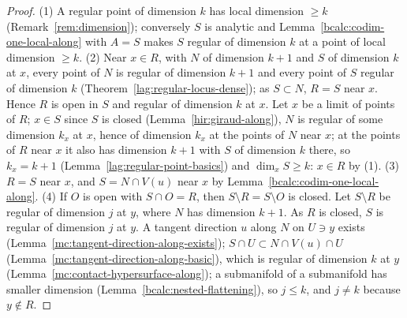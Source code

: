\begin{proof}
\mixedleanok
(1) A regular point of dimension \(k\) has local dimension \(\ge k\) (Remark~\ref{rem:dimension}); conversely \(S\) is analytic and Lemma~\ref{bcalc:codim-one-local-along} with
\(A=S\) makes \(S\) regular of dimension \(k\) at a point of local dimension \(\ge k\). (2) Near \(x\in R\), with \(N\) of dimension \(k+1\) and \(S\) of dimension \(k\) at \(x\),
every point of \(N\) is regular of dimension \(k+1\) and every point of \(S\) regular of dimension \(k\) (Theorem~\ref{lag:regular-locus-dense}); as \(S\subset N\), \(R=S\)
near \(x\). Hence \(R\) is open in \(S\) and regular of dimension \(k\) at \(x\). Let \(x\) be a limit of points of \(R\); \(x\in S\) since \(S\) is closed
(Lemma~\ref{hir:giraud-along}), \(N\) is regular of some dimension \(k_x\) at \(x\), hence of dimension \(k_x\) at the points of \(N\) near \(x\); at the points of \(R\) near
\(x\) it also has dimension \(k+1\) with \(S\) of dimension \(k\) there, so \(k_x=k+1\) (Lemma~\ref{lag:regular-point-basics}) and \(\dim_xS\ge k\): \(x\in R\) by (1).
(3) \(R=S\) near \(x\), and \(S=N\cap V(u)\) near \(x\) by Lemma~\ref{bcalc:codim-one-local-along}. (4) If \(O\) is open with \(S\cap O=R\), then \(S\setminus R=S\setminus O\) is
closed. Let \(S\setminus R\) be regular of dimension \(j\) at \(y\), where \(N\) has dimension \(k+1\). As \(R\) is closed, \(S\) is regular of dimension \(j\) at \(y\). A tangent
direction \(u\) along \(N\) on \(U\ni y\) exists (Lemma~\ref{mc:tangent-direction-along-exists}); \(S\cap U\subset N\cap V(u)\cap U\) (Lemma~\ref{mc:tangent-direction-along-basic}),
which is regular of dimension \(k\) at \(y\) (Lemma~\ref{mc:contact-hypersurface-along}); a submanifold of a submanifold has smaller dimension
(Lemma~\ref{bcalc:nested-flattening}), so \(j\le k\), and \(j\ne k\) because \(y\notin R\).
\end{proof}


